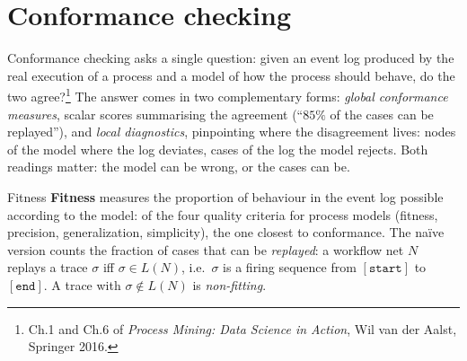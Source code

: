 \section{Conformance checking}

Conformance checking asks a single question: given an event log produced by the real execution of a process and a model of how the process should behave, do the two agree?\footnote{Ch.1 and Ch.6 of \emph{Process Mining: Data Science in Action}, Wil van der Aalst, Springer 2016.} The answer comes in two complementary forms: \emph{global conformance measures}, scalar scores summarising the agreement (``$85\%$ of the cases can be replayed''), and \emph{local diagnostics}, pinpointing where the disagreement lives: nodes of the model where the log deviates, cases of the log the model rejects. Both readings matter: the model can be wrong, or the cases can be.
\begin{definitionbox}{Fitness}
\textbf{Fitness} measures the proportion of behaviour in the event log possible according to the model: of the four quality criteria for process models (fitness, precision, generalization, simplicity), the one closest to conformance. The naïve version counts the fraction of cases that can be \emph{replayed}: a workflow net $N$ replays a trace $\sigma$ iff $\sigma \in L(N)$, i.e.\ $\sigma$ is a firing sequence from $[\mathtt{start}]$ to $[\mathtt{end}]$. A trace with $\sigma \notin L(N)$ is \emph{non-fitting}.
\end{definitionbox}

